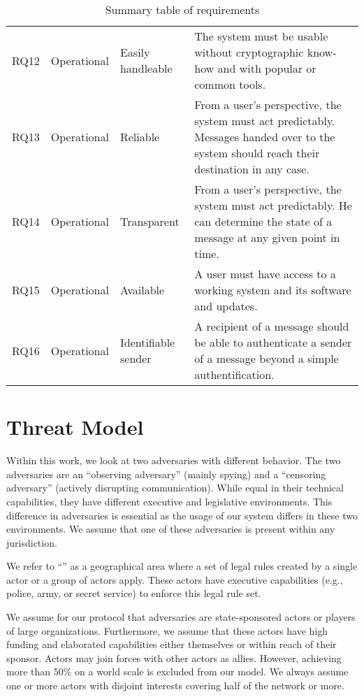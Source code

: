 \begin{table*}[ht]
\begin{tabular}{|l|l|l|p{9.8cm}|}
		RQ12 & Operational & Easily handleable     & The system must be usable without cryptographic know-how and with popular or common tools. \\
		RQ13 & Operational & Reliable            & From a user's perspective, the system must act predictably. Messages handed over to the system should reach their destination in any case. \\
		RQ14 & Operational & Transparent         & From a user's perspective, the system must act predictably. He can determine the state of a message at any given point in time. \\
		RQ15 & Operational & Available           & A user must have access to a working system and its software and updates. \\
		RQ16 & Operational & Identifiable sender & A recipient of a message should be able to authenticate a sender of a message beyond a simple authentification.\\\hline
		
	\end{tabular}
	\egroup
	\caption{Summary table of requirements}
	\label{tab:requiremnts}
\end{table*}

\section{Threat Model}\label{sec:adversary}
Within this work, we look at two adversaries with different behavior. The two adversaries are an ``observing adversary'' (mainly spying) and a ``censoring adversary'' (actively disrupting communication). While equal in their technical capabilities, they have different executive and legislative environments. This difference in adversaries is essential as the usage of our system differs in these two environments. We assume that one of these adversaries is present within any jurisdiction. 

We refer to ``'' as a geographical area where a set of legal rules created by a single actor or a group of actors apply. These actors have executive capabilities (e.g., police, army, or secret service) to enforce this legal rule set.

We assume for our protocol that adversaries are state-sponsored actors or players of large organizations. Furthermore, we assume that these actors have high funding and elaborated capabilities either themselves or within reach of their sponsor. Actors may join forces with other actors as allies. However, achieving more than 50\% on a world scale is excluded from our model. We always assume one or more actors with disjoint interests covering half of the network or more. 

